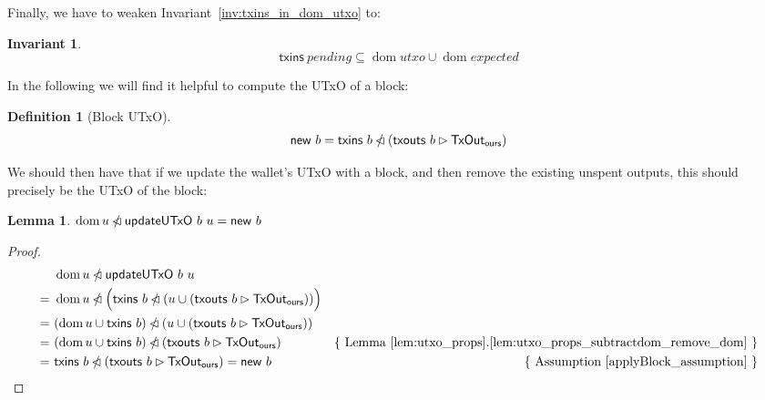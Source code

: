\documentclass{article}
\newcommand{\restrictdom}{\lhd}
\newcommand{\subtractdom}{\mathbin{\slashed{\restrictdom}}}
\newcommand{\restrictrange}{\rhd}
\DeclareMathOperator{\dom}{dom}
\newtheorem{lemma}{Lemma}
\newtheorem{invariant}{Invariant}
\newtheorem{definition}{Definition}
\begin{document}
Finally, we have to weaken Invariant~\ref{inv:txins_in_dom_utxo} to:

\begin{invariant}
\begin{equation*}
\mathsf{txins} ~ pending \subseteq \dom utxo \cup \dom expected
\end{equation*}
\label{inv:txins_in_dom_utxo_expected}
\end{invariant}

In the following we will find it helpful to compute the UTxO of a block:
%
\begin{definition}[Block UTxO]
\begin{equation*}
\mathsf{new} ~ b = \mathsf{txins} ~ b \subtractdom (\mathsf{txouts} ~ b \restrictrange \mathsf{TxOut_{ours}})
\end{equation*}
\end{definition}
%
We should then have that if we update the wallet's UTxO with a block, and then
remove the existing unspent outputs, this should precisely be the UTxO of
the block:
%
\begin{lemma} \label{lemma:update_remove_dom}
\begin{math}
\dom u \subtractdom \mathsf{updateUTxO} ~ b ~ u  = \mathsf{new} ~ b
\end{math}
\end{lemma}

\begin{proof}
\begin{align*}
  & ~ \dom u \subtractdom \mathsf{updateUTxO} ~ b ~ u \\
= & ~ \dom u \subtractdom \Bigl( \mathsf{txins} ~ b \subtractdom (u \cup (\mathsf{txouts} ~ b \restrictrange \mathsf{TxOut_{ours}})) \Bigr) \\
= & ~ (\dom u \cup \mathsf{txins} ~ b) \subtractdom (u \cup (\mathsf{txouts} ~ b \restrictrange \mathsf{TxOut_{ours}})) \\
= & ~ (\dom u \cup \mathsf{txins} ~ b) \subtractdom (\mathsf{txouts} ~ b \restrictrange \mathsf{TxOut_{ours}}) & \text{\{ Lemma~\ref{lem:utxo_props}.\ref{lem:utxo_props_subtractdom_remove_dom} \}} \\
= & ~ \mathsf{txins} ~ b \subtractdom (\mathsf{txouts} ~ b \restrictrange \mathsf{TxOut_{ours}}) = \mathsf{new} ~ b & \text{\{ Assumption~\ref{applyBlock_assumption} \}}
\end{align*}
\end{proof}

\end{document}
